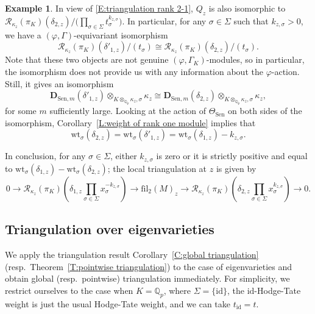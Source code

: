 \documentclass[12pt]{article}
\theoremstyle{definition}
\newtheorem{example}[theorem]{Example}
\numberwithin{equation}{theorem}
\newcommand{\calR}{\mathcal{R}}
\newcommand{\QQ}{\mathbb{Q}}
\newcommand{\bbD}{\mathbf{D}}
\newcommand{\fil}{\mathrm{fil}}
\def\Qp{\QQ_p}
\newcommand{\Sen}{\mathrm{Sen}}
\begin{document}
\begin{example}
In view of \eqref{E:triangulation rank 2-1}, $Q_z$ is also isomorphic
to $\calR_{\kappa_z}(\pi_K)(\delta_{2,z}) / \big( \prod_{\sigma \in
  \Sigma}t_\sigma^{k_{z,\sigma}} \big)$.  In particular, for any
$\sigma \in \Sigma$ such that $k_{z,\sigma} >0$, we have a $(\varphi,
\Gamma)$-equivariant isomorphism
\[
\calR_{\kappa_z}(\pi_K)(\delta'_{1,z}) / (t_\sigma) \cong \calR_{\kappa_z}(\pi_K) (\delta_{2,z})/(t_\sigma).
\]
Note that these two objects are not genuine $(\varphi, \Gamma_K)$-modules, so in particular, the isomorphism does not provide us with any information about the $\varphi$-action.  Still, it gives an isomorphism
\[
\bbD_{\Sen, m}(\delta'_{1, z}) \otimes_{K \otimes_{\Qp} \kappa_z, \sigma} \kappa_z \cong \bbD_{\Sen, m}(\delta_{2, z}) \otimes_{K \otimes_{\Qp} \kappa_z, \sigma} \kappa_z,
\]
for some $m$ sufficiently large.  Looking at the action of
$\Theta_\Sen$ on both sides of the isomorphism,
Corollary~\ref{L:weight of rank one module} implies that \[
\mathrm{wt}_\sigma(\delta_{2,z}) = \mathrm{wt}_\sigma(\delta'_{1,z}) =
\mathrm{wt}_\sigma(\delta_{1,z}) - k_{z,\sigma}.
\]

In conclusion, for any $\sigma \in \Sigma$, either $k_{z,\sigma}$ is
zero or it is strictly positive and equal to
$\mathrm{wt}_\sigma(\delta_{1,z}) - \mathrm{wt}_\sigma(\delta_{2,z})$;
the local triangulation at $z$ is given by
\begin{equation}\label{E:conclusion}
0 \to \calR_{\kappa_z}(\pi_K)(\delta_{1,z}\prod_{\sigma\in \Sigma}
x_\sigma^{-k_{z,\sigma}}) \to \fil_2(M)_z \to
\calR_{\kappa_z}(\pi_K)(\delta_{2,z}\prod_{\sigma\in \Sigma}
x_\sigma^{k_{z,\sigma}}) \to 0.
\end{equation}
\end{example}



\subsection{Triangulation over eigenvarieties}

We apply the triangulation result Corollary~\ref{C:global triangulation} (resp.\ Theorem~\ref{T:pointwise triangulation}) to the case of eigenvarieties and obtain global (resp.\ pointwise) triangulation immediately.  For simplicity, we restrict ourselves to the case when $K = \Qp$, where $\Sigma = \{\mathrm{id}\}$, the $\mathrm{id}$-Hodge-Tate weight is just the usual Hodge-Tate weight, and we can take $t_\mathrm{id} = t$.
\end{document}
